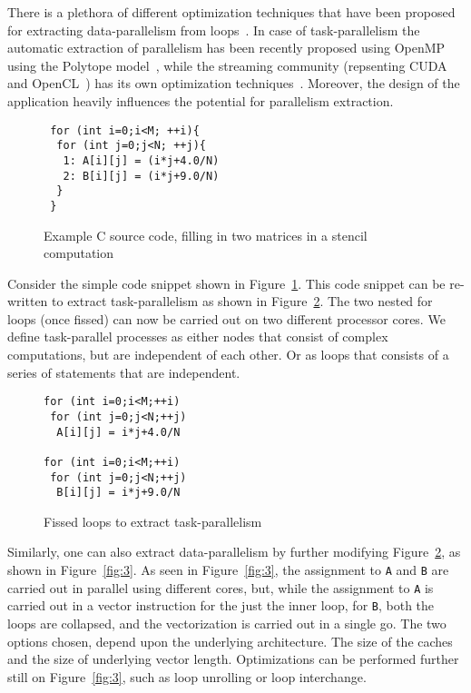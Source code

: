 \documentclass[10pt, conference, compsocconf]{IEEEtran}
\begin{document}
There is a plethora of different optimization techniques that have been
proposed for extracting data-parallelism from
loops~\cite{smuc97,mgri98}. In case of task-parallelism the automatic
extraction of parallelism has been recently proposed using OpenMP using
the Polytope model~\cite{mgri98}, while the streaming community
(repsenting CUDA~\cite{jsan10} and OpenCL~\cite{opencl08}) has its own
optimization techniques~\cite{mgor06}. Moreover, the design of the
application heavily influences the potential for parallelism extraction.


\begin{figure}[h!]
  \centering
  \small{
\begin{verbatim}
 for (int i=0;i<M; ++i){
  for (int j=0;j<N; ++j){
   1: A[i][j] = (i*j+4.0/N)
   2: B[i][j] = (i*j+9.0/N)
  }
 }
\end{verbatim}
  }
  \caption{Example C source code, filling in two matrices in a stencil
    computation}
  \label{fig:1}
\end{figure}

Consider the simple code snippet shown in Figure~\ref{fig:1}. This code
snippet can be re-written to extract task-parallelism as shown in
Figure~\ref{fig:2}. The two nested for loops (once fissed) can now be
carried out on two different processor cores. We define task-parallel
processes as either nodes that consist of complex computations, but are
independent of each other. Or as loops that consists of a series of
statements that are independent.

\begin{figure}[h!]
  \centering
  \small{
\begin{verbatim}
for (int i=0;i<M;++i)
 for (int j=0;j<N;++j)
  A[i][j] = i*j+4.0/N

for (int i=0;i<M;++i)
 for (int j=0;j<N;++j)
  B[i][j] = i*j+9.0/N
\end{verbatim}
  }
  
  \caption{Fissed loops to extract task-parallelism}
  \label{fig:2}
\end{figure}

Similarly, one can also extract data-parallelism by further modifying
Figure~\ref{fig:2}, as shown in Figure~\ref{fig:3}. As seen in
Figure~\ref{fig:3}, the assignment to \texttt{A} and \texttt{B} are
carried out in parallel using different cores, but, while the assignment
to \texttt{A} is carried out in a vector instruction for the just the
inner loop, for \texttt{B}, both the loops are collapsed, and the
vectorization is carried out in a single go. The two options chosen,
depend upon the underlying architecture. The size of the caches and the
size of underlying vector length. Optimizations can be performed further
still on Figure~\ref{fig:3}, such as loop unrolling or loop interchange.
\end{document}
